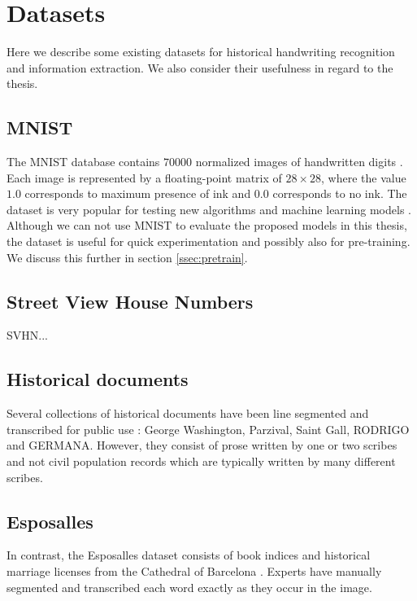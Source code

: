 \section{Datasets}

Here we describe some existing datasets for historical handwriting recognition and information extraction. We also consider their usefulness in regard to the thesis.

\subsection{MNIST}

The MNIST database contains $70000$ normalized images of handwritten digits \cite{MNIST_orig}.
Each image is represented by a floating-point matrix of $28 \times 28$, where the value $1.0$ corresponds to maximum presence of ink and $0.0$ corresponds to no ink.
The dataset is very popular for testing new algorithms and machine learning models \cite{MNIST}.
Although we can not use MNIST to evaluate the proposed models in this thesis, the dataset is useful for quick experimentation and possibly also for pre-training. We discuss this further in section \ref{ssec:pretrain}.

\subsection{Street View House Numbers}

SVHN...


\subsection{Historical documents}
Several collections of historical documents have been line segmented and transcribed for public use \cite{esposalles}: George Washington, Parzival, Saint Gall, RODRIGO and GERMANA. However, they consist of prose written by one or two scribes and not civil population records which are typically written by many different scribes.

\subsection{Esposalles}
In contrast, the Esposalles dataset consists of book indices and historical marriage licenses from the Cathedral of Barcelona \cite{esposalles}. Experts have manually segmented and transcribed each word exactly as they occur in the image.

